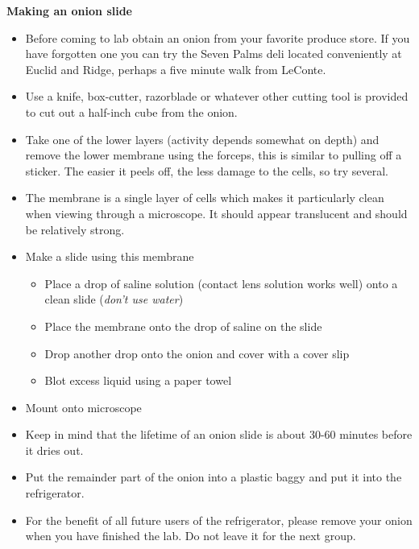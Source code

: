 \documentclass{../lab}
\begin{document}
\textbf{Making an onion slide}\begin{itemize}
    \item Before coming to lab obtain an onion from your favorite produce store. If you have forgotten one you can try the Seven Palms deli located conveniently at Euclid and Ridge, perhaps a five minute walk from LeConte.

    \item Use a knife, box-cutter, razorblade or whatever other cutting tool is provided to cut out a half-inch cube from the onion.

    \item Take one of the lower layers (activity depends somewhat on depth) and remove the lower membrane using the forceps, this is similar to pulling off a sticker. The easier it peels off, the less damage to the cells, so try several.

    \item The membrane is a single layer of cells which makes it particularly clean when viewing through a microscope. It should appear translucent and should be relatively strong.

    \item Make a slide using this membrane

    \begin{itemize}
        \item Place a drop of saline solution (contact lens solution works well) onto a clean slide (\emph{don't use water})

        \item Place the membrane onto the drop of saline on the slide

        \item Drop another drop onto the onion and cover with a cover slip

        \item Blot excess liquid using a paper towel

    \end{itemize}

    \item Mount onto microscope

    \item Keep in mind that the lifetime of an onion slide is about 30-60 minutes before it dries out.

    \item Put the remainder part of the onion into a plastic baggy and put it into the refrigerator.

    \item For the benefit of all future users of the refrigerator, please remove your onion when you have finished the lab. Do not leave it for the next group.

\end{itemize}
\end{document}
